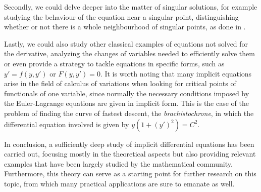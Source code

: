 Secondly, we could delve deeper into the matter of singular solutions, for example studying the behaviour of the equation near a singular point, distinguishing whether or not there is a whole neighbourhood of singular points, as done in \cite{rabier1989implicit}.

Lastly, we could also study other classical examples of equations not solved for the derivative, analyzing the changes of variables needed to efficiently solve them or even provide a strategy to tackle equations in specific forms, such as $y'=f(y,y')$ or $F(y,y')=0$. It is worth noting that many implicit equations arise in the field of calculus of variations when looking for critical points of functionals of one variable, since normally the necessary conditions imposed by the Euler-Lagrange equations are given in implicit form. This is the case of the problem of finding the curve of fastest descent, the \textit{brachistochrone}, in which the differential equation involved is given by $y(1+(y')^2)=C^2$.

In conclusion, a sufficiently deep study of implicit differential equations has been carried out, focusing mostly in the theoretical aspects but also providing relevant examples that have been largely studied by the mathematical community. Furthermore, this theory can serve as a starting point for further research on this topic, from which many practical applications are sure to emanate as well.
